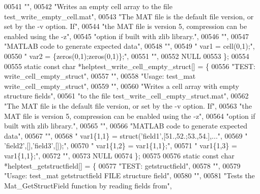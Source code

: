 \begin{DoxyCode}
{{00541     \textcolor{stringliteral}{""},
00542     \textcolor{stringliteral}{"Writes an empty cell array to the file test\_write\_empty\_cell.mat"},
00543     \textcolor{stringliteral}{"The MAT file is the default file version, or set by the -v option. If"},
00544     \textcolor{stringliteral}{"the MAT file is version 5, compression can be enabled using the -z"},
00545     \textcolor{stringliteral}{"option if built with zlib library."},
00546     \textcolor{stringliteral}{""},
00547     \textcolor{stringliteral}{"MATLAB code to generate expected data"},
00548     \textcolor{stringliteral}{""},
00549     \textcolor{stringliteral}{"    var1 = cell(0,1);"},
00550     \textcolor{stringliteral}{"    var2 = \{zeros(0,1);zeros(0,1)\};"},
00551     \textcolor{stringliteral}{""},
00552     NULL
00553 \};
00554 
00555 \textcolor{keyword}{static} \textcolor{keyword}{const} \textcolor{keywordtype}{char} *helptest\_write\_cell\_empty\_struct[] = \{
00556     \textcolor{stringliteral}{"TEST: write\_cell\_empty\_struct"},
00557     \textcolor{stringliteral}{""},
00558     \textcolor{stringliteral}{"Usage: test\_mat write\_cell\_empty\_struct"},
00559     \textcolor{stringliteral}{""},
00560     \textcolor{stringliteral}{"Writes a cell array with empty structure fields"},
00561     \textcolor{stringliteral}{"to the file test\_write\_cell\_empty\_struct.mat"},
00562     \textcolor{stringliteral}{"The MAT file is the default file version, or set by the -v option. If"},
00563     \textcolor{stringliteral}{"the MAT file is version 5, compression can be enabled using the -z"},
00564     \textcolor{stringliteral}{"option if built with zlib library."},
00565     \textcolor{stringliteral}{""},
00566     \textcolor{stringliteral}{"MATLAB code to generate expected data"},
00567     \textcolor{stringliteral}{""},
00568     \textcolor{stringliteral}{"    var1\{1,1\} = struct('field1',[51.,52.;53.,54.],..."},
00569     \textcolor{stringliteral}{"                       'field2',[],'field3',[]);"},
00570     \textcolor{stringliteral}{"    var1\{1,2\} = var1\{1,1\};"},
00571     \textcolor{stringliteral}{"    var1\{1,3\} = var1\{1,1\};"},
00572     \textcolor{stringliteral}{""},
00573     NULL
00574 \};
00575 
00576 \textcolor{keyword}{static} \textcolor{keyword}{const} \textcolor{keywordtype}{char} *helptest\_getstructfield[] = \{
00577     \textcolor{stringliteral}{"TEST: getstructfield"},
00578     \textcolor{stringliteral}{""},
00579     \textcolor{stringliteral}{"Usage: test\_mat getstructfield FILE structure field"},
00580     \textcolor{stringliteral}{""},
00581     \textcolor{stringliteral}{"Tests the Mat\_GetStructField function by reading fields from"},
}}
\end{DoxyCode}

